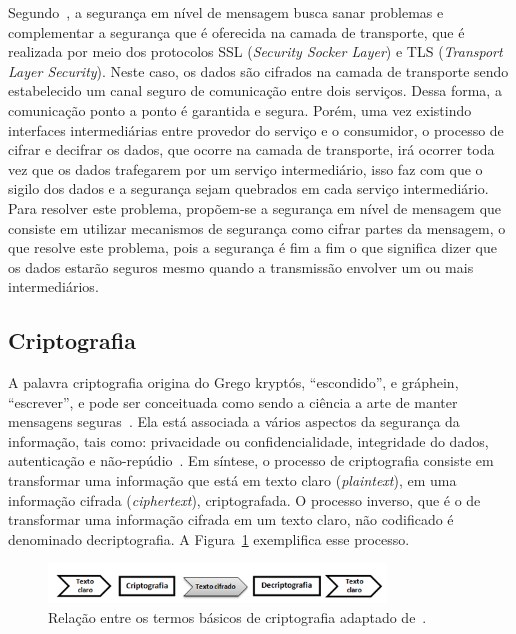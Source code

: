 Segundo~\cite{SOASecurity2008}, a segurança em nível de mensagem busca sanar problemas e complementar a segurança que é oferecida na camada de transporte, que é realizada por meio dos protocolos SSL (\emph{Security Socker Layer}) e TLS (\emph{Transport Layer Security}). Neste caso, os dados são cifrados na camada de transporte sendo estabelecido um canal seguro de comunicação entre dois serviços. Dessa forma, a comunicação ponto a ponto é garantida e segura. Porém, uma vez existindo interfaces intermediárias entre provedor do serviço e o consumidor, o processo de cifrar e decifrar os dados, que ocorre na camada de transporte, irá ocorrer toda vez que os dados trafegarem por um serviço intermediário, isso faz com que o sigilo dos dados e a segurança sejam quebrados em cada serviço intermediário. Para resolver este problema, propõem-se a segurança em nível de mensagem que consiste em utilizar mecanismos de segurança como cifrar partes da mensagem, o que resolve este problema, pois a segurança é fim a fim o que significa dizer que os dados estarão seguros mesmo quando a transmissão envolver um ou mais intermediários.

\subsection{Criptografia}

A palavra criptografia origina do Grego kryptós, ``escondido'', e gráphein, ``escrever'',  e pode ser  conceituada como sendo a ciência a arte de manter mensagens seguras~\cite{Schneier1995}. Ela está  associada a vários aspectos da segurança da informação, tais como: privacidade ou confidencialidade, integridade do dados, autenticação e não-repúdio~\cite{Menezes1996}. Em síntese, o processo de criptografia consiste em transformar uma informação que está em texto claro (\emph{plaintext}), em uma informação cifrada (\emph{ciphertext}), criptografada. O processo inverso, que é o de transformar uma informação cifrada em um texto claro, não codificado é denominado decriptografia. A Figura~\ref{fig:processocriptografia} exemplifica esse processo.

\begin{figure}[!htb]
\centering
\includegraphics[width=0.8\textwidth]{processocriptografia.png}
\caption{Relação entre os termos  básicos de criptografia adaptado de~\cite{Schneier1995}.}
\label{fig:processocriptografia}
\end{figure}

